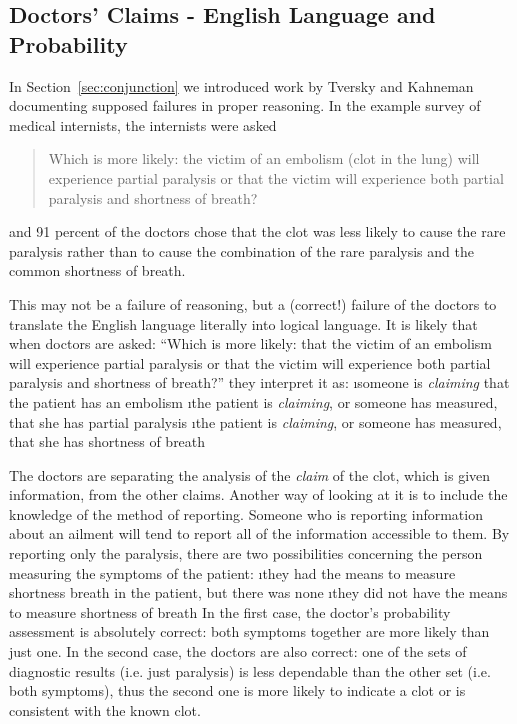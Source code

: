 \subsection{Doctors' Claims - English Language and Probability}

In Section~\ref{sec:conjunction} we introduced work by Tversky and Kahneman documenting supposed failures in proper reasoning.  In the example survey of medical internists, the internists were asked 
\begin{quote}
Which is more likely: the victim of an embolism (clot in the lung) will experience partial paralysis or that the victim will experience both partial paralysis and shortness of breath?
\end{quote}
and 91 percent of the doctors chose that the clot was less likely to cause the rare paralysis rather than to cause the combination of the rare paralysis and the common shortness of breath.  

This may not be a failure of reasoning, but a (correct!) failure of the doctors to translate the English language literally into logical language.  It is likely that when doctors are asked: ``Which is more likely: that the victim of an embolism will experience partial paralysis or that the victim will experience both partial paralysis and shortness of breath?'' they interpret it as:
\be
\i someone is {\em claiming} that the patient has an embolism
\i the patient is {\em claiming}, or someone has measured, that she has partial paralysis
\i the patient is {\em claiming}, or someone has measured, that she has shortness of breath
\ee

The doctors are separating the analysis of the \emph{claim} of the clot, which is given information, from the other claims. Another way of looking at it is to include the knowledge of the method of reporting. Someone who is reporting information about an ailment will tend to report all of the information accessible to them. By reporting only the paralysis, there are two possibilities concerning the person measuring the symptoms of the patient:
\be
\i they had the means to measure shortness breath in the patient, but there was none
\i they did not have the means to measure shortness of breath
\ee
In the first case, the doctor's probability assessment is absolutely correct: both symptoms together are more likely than just one. In the second case, the doctors are also correct: one of the sets of diagnostic results (i.e. just paralysis) is less dependable than the other set (i.e. both symptoms), thus the second one is more likely to indicate a clot or is consistent with the known clot.

